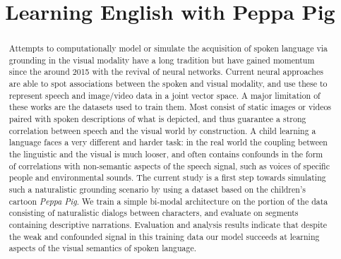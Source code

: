 \documentclass[a4paper]{article}
\begin{document}
\title{Learning English with Peppa Pig}

\author{}
\date{}


\maketitle
\begin{abstract}
  Attempts to computationally model or simulate the acquisition of
  spoken language via grounding in the visual modality have a long
  tradition but have gained momentum since the around 2015 with the
  revival of neural networks. Current neural approaches are able to
  spot associations between the spoken and visual modality, and use
  these to represent speech and image/video data in a joint vector
  space. A major limitation of these works are the datasets used to
  train them. Most consist of static images or videos paired with
  spoken descriptions of what is depicted, and thus guarantee a strong
  correlation between speech and the visual world by construction. A
  child learning a language faces a very different and harder task: in
  the real world the coupling between the linguistic and the visual is
  much looser, and often contains confounds in the form of
  correlations with non-semantic aspects of the speech signal, such as
  voices of specific people and environmental sounds. The current
  study is a first step towards simulating such a naturalistic
  grounding scenario by using a dataset based on the children's
  cartoon {\it Peppa Pig}. We train a simple bi-modal architecture on
  the portion of the data consisting of naturalistic dialogs between
  characters, and evaluate on segments containing descriptive
  narrations. Evaluation and analysis results indicate that despite
  the weak and confounded signal in this training data our model
  succeeds at learning aspects of the visual semantics of spoken
  language.
\end{abstract}









\end{document}
